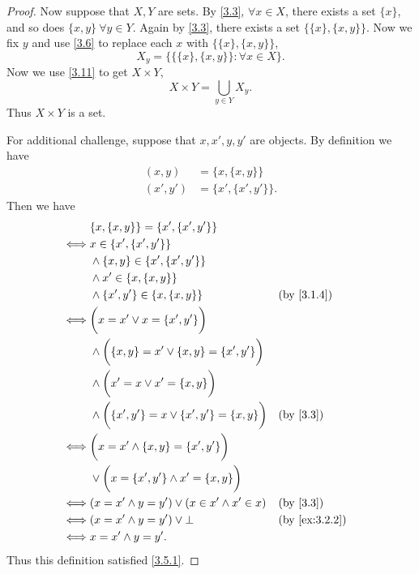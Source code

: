 \begin{proof}
  Now suppose that \(X, Y\) are sets.
  By \cref{3.3}, \(\forall x \in X\), there exists a set \(\{x\}\), and so does \(\{x, y\} \ \forall y \in Y\).
  Again by \cref{3.3}, there exists a set \(\{\{x\}, \{x, y\}\}\).
  Now we fix \(y\) and use \cref{3.6} to replace each \(x\) with \(\{\{x\}, \{x, y\}\}\),
  \[
    X_y = \{\{\{x\}, \{x, y\}\} : \forall x \in X\}.
  \]
  Now we use \cref{3.11} to get \(X \times Y\),
  \[
    X \times Y = \bigcup_{y \in Y} X_y.
  \]
  Thus \(X \times Y\) is a set.

  For additional challenge, suppose that \(x, x', y, y'\) are objects.
  By definition we have
  \begin{align*}
    (x, y)   & = \{x, \{x, y\}\}     \\
    (x', y') & = \{x', \{x', y'\}\}.
  \end{align*}
  Then we have
  \begin{align*}
         & \{x, \{x, y\}\} = \{x', \{x', y'\}\}                                                    \\
    \iff & x \in \{x', \{x', y'\}\}                                                                \\
         & \land \{x, y\} \in \{x', \{x', y'\}\}                                                   \\
         & \land x' \in \{x, \{x, y\}\}                                                            \\
         & \land \{x', y'\} \in \{x, \{x, y\}\}                        &  & \by{3.1.4}             \\
    \iff & \bigg(x = x' \lor x = \{x', y'\}\bigg)                                                  \\
         & \land \bigg(\{x, y\} = x' \lor \{x, y\} = \{x', y'\}\bigg)                              \\
         & \land \bigg(x' = x \lor x' = \{x, y\}\bigg)                                             \\
         & \land \bigg(\{x', y'\} = x \lor \{x', y'\} = \{x, y\}\bigg) &  & \text{(by \cref{3.3})} \\
    \iff & \bigg(x = x' \land \{x, y\} = \{x', y'\}\bigg)                                          \\
         & \lor \bigg(x = \{x', y'\} \land x' = \{x, y\}\bigg)                                     \\
    \iff & (x = x' \land y = y') \lor (x \in x' \land x' \in x)        &  & \text{(by \cref{3.3})} \\
    \iff & (x = x' \land y = y') \lor \bot                             &  & \by{ex:3.2.2}          \\
    \iff & x = x' \land y = y'.
  \end{align*}
  Thus this definition satisfied \cref{3.5.1}.
\end{proof}

